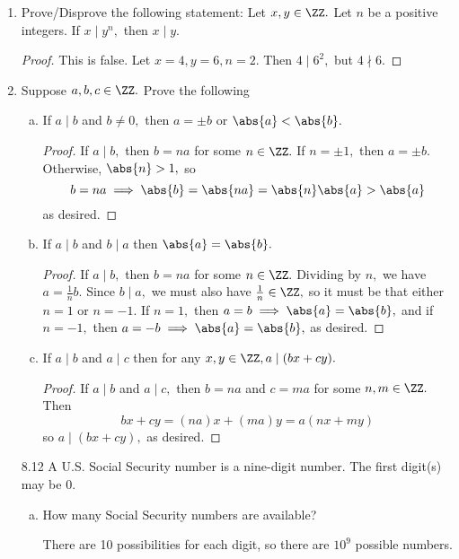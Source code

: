 \documentclass{article}
\begin{document}
\begin{enumerate}
\begin{enumerate}[(a)]
		\end{enumerate}

	\item Prove/Disprove the following statement: Let $x, y\in\ZZ.$ Let $n$ be a positive integers. If $x\mid y^n,$ then $x\mid y.$
		\begin{proof}
			This is false. Let $x=4, y=6, n=2.$ Then $4\mid 6^2,$ but $4\nmid 6.$
		\end{proof}

		\newpage
	\item Suppose $a, b, c\in\ZZ.$ Prove the following
		\begin{enumerate}[(a)]
			\item If $a\mid b$ and $b\neq 0,$ then $a=\pm b$ or $\abs{a}<\abs{b}.$
				\begin{proof}
					If $a\mid b,$ then $b=na$ for some $n\in\ZZ.$ If $n=\pm 1,$ then $a=\pm b.$ Otherwise, $\abs{n}>1,$ so
					\[b=na\implies\abs{b}=\abs{na}=\abs{n}\abs{a} > \abs{a}\]
					as desired.
				\end{proof}

			\item If $a\mid b$ and $b\mid a$ then $\abs{a}=\abs{b}.$
				\begin{proof}
					If $a\mid b,$ then $b=na$ for some $n\in \ZZ.$ Dividing by $n,$ we have $a=\frac{1}{n}b.$ Since $b\mid a,$ we must also have $\frac{1}{n}\in\ZZ,$ so it must be that either $n=1$ or $n=-1.$ If $n=1,$ then $a=b\implies \abs{a}=\abs{b},$ and if $n=-1,$ then $a=-b\implies \abs{a}=\abs{b},$ as desired.
				\end{proof}

			\item If $a\mid b$ and $a\mid c$ then for any $x, y\in\ZZ, a\mid(bx+cy).$
				\begin{proof}
					If $a\mid b$ and $a\mid c,$ then $b=na$ and $c=ma$ for some $n, m\in\ZZ.$ Then
					\[bx+cy=(na)x+(ma)y = a(nx+my)\]
					so $a\mid (bx+cy),$ as desired.
				\end{proof}
				
		\end{enumerate}

	\item[8.12] A U.S. Social Security number is a nine-digit number. The first digit(s) may be 0.
		\begin{enumerate}[a.]
			\item How many Social Security numbers are available?
				\begin{answer*}
					There are 10 possibilities for each digit, so there are $10^9$ possible numbers.
				\end{answer*}


\end{enumerate}
\end{enumerate}
\end{document}
